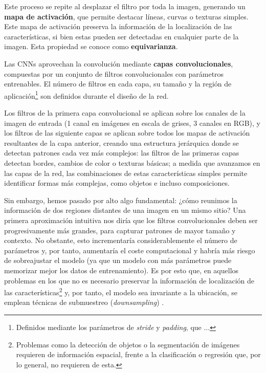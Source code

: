 Este proceso se repite al desplazar el filtro por toda la imagen, generando un \textbf{mapa de activación},
que permite destacar líneas, curvas o texturas simples. Este mapa de activación preserva la información de 
la localización de las características, si bien estas pueden ser detectadas en cualquier parte de la imagen. 
Esta propiedad se conoce como \textbf{equivarianza}. 

Las CNNs aprovechan la convolución mediante \textbf{capas convolucionales}, compuestas por un conjunto de 
filtros convolucionales con parámetros entrenables. El número de filtros en cada capa, su tamaño y la región 
de aplicación\footnote{
    Definidos mediante los parámetros de \textit{stride} y \textit{padding}, que ...
} son definidos durante el diseño de la red.

Los filtros de la primera capa convolucional se aplican sobre los canales de la imagen de entrada (1 canal 
en imágenes en escala de grises, 3 canales en RGB), y los filtros de las siguiente capas se aplican sobre 
todos los mapas de activación resultantes de la capa anterior, creando una estructura jerárquica donde se 
detectan patrones cada vez más complejos: las filtros de las primeras capas detectan bordes, cambios de color 
o texturas básicas; a medida que avanzamos en las capas de la red, las combinaciones de estas características
simples permite identificar formas más complejas, como objetos e incluso composiciones.

Sin embargo, hemos pasado por alto algo fundamental: ¿cómo reunimos la información de dos regiones distantes 
de una imagen en un mismo sitio? Una primera aproximación intuitiva nos diría que los filtros convolucionales 
deben ser progresivamente más grandes, para capturar patrones de mayor tamaño y contexto. No obstante, esto
incrementaría considerablemente el número de parámetros y, por tanto, aumentaría el coste computacional y 
habría más riesgo de sobreajustar el modelo (ya que un modelo con más parámetros puede memorizar mejor los
datos de entrenamiento). Es por esto que, en aquellos problemas en los que no es necesario preservar la 
información de localización
de las características\footnote{
    Problemas como la detección de objetos o la segmentación de imágenes requieren de información espacial,
    frente a la clasificación o regresión que, por lo general, no requieren de esta.
} y, por tanto, el modelo sea invariante a la ubicación, se emplean técnicas de submuestreo 
(\textit{downsampling}) \cite{murphy2022}.





